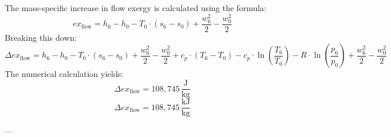 The mass-specific increase in flow exergy is calculated using the formula:  
\[
ex_{\text{flow}} = h_6 - h_0 - T_0 \cdot (s_6 - s_0) + \frac{w_6^2}{2} - \frac{w_0^2}{2}
\]  
Breaking this down:  
\[
\Delta ex_{\text{flow}} = h_6 - h_0 - T_0 \cdot (s_6 - s_0) + \frac{w_6^2}{2} - \frac{w_0^2}{2} + c_p \cdot (T_6 - T_0) - c_p \cdot \ln\left(\frac{T_6}{T_0}\right) - R \cdot \ln\left(\frac{p_6}{p_0}\right) + \frac{w_6^2}{2} - \frac{w_0^2}{2}
\]  
The numerical calculation yields:  
\[
\Delta ex_{\text{flow}} = 108,745 \, \frac{\text{J}}{\text{kg}}
\]  
\[
\Delta ex_{\text{flow}} = 108,745 \, \frac{\text{kJ}}{\text{kg}}
\]  

---